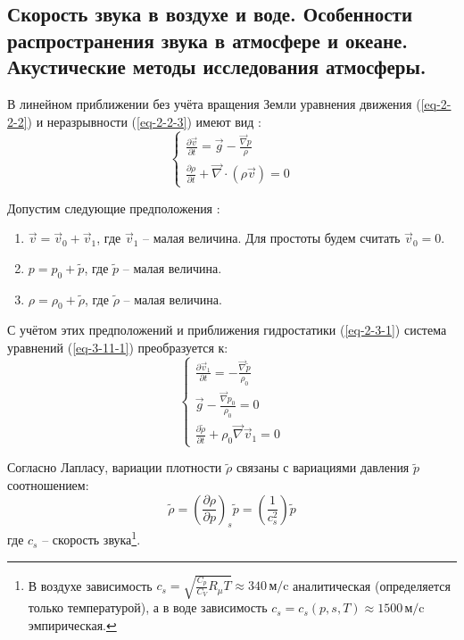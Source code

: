 \subsection{Скорость звука в воздухе и воде. Особенности распространения звука в атмосфере и океане. Акустические методы исследования атмосферы.}
В линейном приближении без учёта вращения Земли уравнения движения (\ref{eq-2-2-2}) и неразрывности (\ref{eq-2-2-3}) имеют вид \cite{Носов-2019-14}:
\begin{equation}\label{eq-3-11-1}
\begin{cases}
\frac{\partial\vec{v}}{\partial t}=\vec{g}-\frac{\vec{\nabla}p}{\rho}
\\
\frac{\partial\rho}{\partial t}+\vec{\nabla}\cdot(\rho\vec{v})=0
\end{cases}
\end{equation}

Допустим следующие предположения \cite{Носов-2019-14}:
\begin{enumerate}
\item $\vec{v}=\vec{v}_0+\vec{v}_1$, где $\vec{v}_1$ -- малая величина. Для простоты будем считать $\vec{v}_0=0$.
\item $p=p_0+\widetilde{p}$, где $\widetilde{p}$ -- малая величина.
\item $\rho=\rho_0+\widetilde{\rho}$, где $\widetilde{\rho}$ -- малая величина.
\end{enumerate}

С учётом этих предположений и приближения гидростатики (\ref{eq-2-3-1}) система уравнений (\ref{eq-3-11-1}) преобразуется к:
\begin{equation}\label{eq-3-11-2}
\begin{cases}
\frac{\partial\vec{v}_1}{\partial t}=-\frac{\vec{\nabla}\widetilde{p}}{\rho_0}
\\
\vec{g}-\frac{\vec{\nabla}p_0}{\rho_0}=0
\\
\frac{\partial\widetilde{\rho}}{\partial t}+\rho_0\vec{\nabla}\vec{v}_1=0
\end{cases}
\end{equation}

Согласно Лапласу, вариации плотности $\widetilde{\rho}$ связаны с вариациями давления $\widetilde{p}$ соотношением:
\begin{equation}\label{eq-3-11-3}
\widetilde{\rho}=\left(\frac{\partial\rho}{\partial p}\right)_s\widetilde{p}=\left(\frac{1}{c_s^2}\right)\widetilde{p}
\end{equation}
где $c_s$ -- скорость звука\footnote{В воздухе зависимость $c_s=\sqrt{\frac{C_p}{C_V}R_{\mu}T}\approx340\,\text{м/c}$ аналитическая (определяется только температурой), а в воде зависимость $c_s=c_s(p, s, T)\approx1500\,\text{м/c}$ эмпирическая.}.

